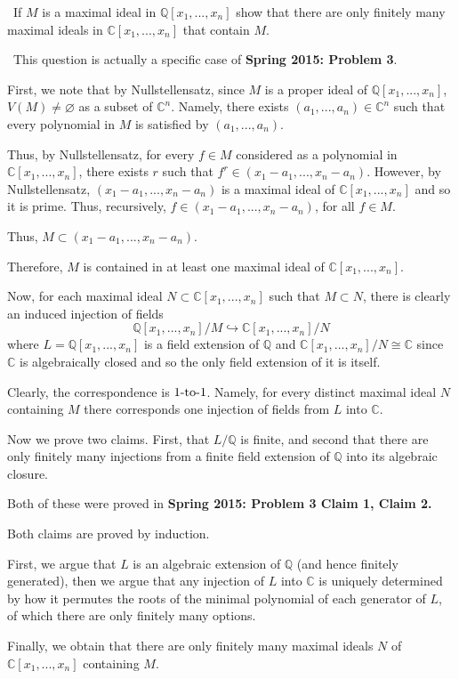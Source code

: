 \documentclass[12pt]{Qual}
\begin{document}
\begin{problem} $\,$
If $M$ is a maximal ideal in $\mathbb{Q}[x_1,...,x_n]$ show that there are only finitely many maximal ideals in $\mathbb{C}[x_1,...,x_n]$ that contain $M.$
\end{problem}


\begin{solution}$\,$
This question is actually a specific case of \textbf{Spring 2015: Problem 3}.

First, we note that by Nullstellensatz, since $M$ is a proper ideal of $\mathbb{Q}[x_1,...,x_n]$, $V(M)\not=\varnothing$ as a subset of $\mathbb{C}^n$. Namely, there exists $(a_1,...,a_n)\in\mathbb{C}^n$ such that every polynomial in $M$ is satisfied by $(a_1,...,a_n)$.

Thus, by Nullstellensatz, for every $f\in M$ considered as a polynomial in $\mathbb{C}[x_1,...,x_n]$, there exists $r$ such that $f^r\in (x_1-a_1,...,x_n-a_n)$. However, by Nullstellensatz, $(x_1-a_1,...,x_n-a_n)$
 is a maximal ideal of $\mathbb{C}[x_1,...,x_n]$ and so it is prime. Thus, recursively, $f\in (x_1-a_1,...,x_n-a_n)$, for all $f\in M$.

Thus, $M\subset (x_1-a_1,...,x_n-a_n).$

Therefore, $M$ is contained in at least one maximal ideal of $\mathbb{C}[x_1,...,x_n].$

Now, for each maximal ideal $N\subset\mathbb{C}[x_1,...,x_n]$ such that $M\subset N$, there is clearly an induced injection of fields $$\mathbb{Q}[x_1,...,x_n]/M\hookrightarrow\mathbb{C}[x_1,...,x_n]/N$$ where $L=\mathbb{Q}[x_1,...,x_n]$ is a field extension of $\mathbb{Q}$ and $\mathbb{C}[x_1,...,x_n]/N\cong \mathbb{C}$ since $\mathbb{C}$ is algebraically closed and so the only field extension of it is itself.

Clearly, the correspondence is $1\text{-to-}1$. Namely, for every distinct maximal ideal $N$ containing $M$ there corresponds one injection of fields from $L$ into $\mathbb{C}.$

Now we prove two claims. First, that $L/\mathbb{Q}$ is finite, and second that there are only finitely many injections from a finite field extension of $\mathbb{Q}$ into its algebraic closure.

Both of these were proved in \textbf{Spring 2015: Problem 3 Claim 1, Claim 2.}

Both claims are proved by induction.

First, we argue that $L$ is an algebraic extension of $\mathbb{Q}$ (and hence finitely generated), then we argue that any injection of $L$ into $\mathbb{C}$ is uniquely determined by how it permutes the roots of the minimal polynomial of each generator of $L$, of which there are only finitely many options.

Finally, we obtain that there are only finitely many maximal ideals $N$ of $\mathbb{C}[x_1,...,x_n]$ containing $M.$
\end{solution}
\newpage
\end{document}
